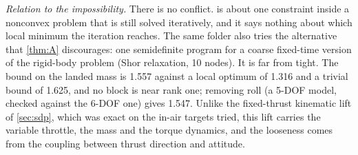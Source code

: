 \emph{Relation to the impossibility.} There is no conflict.  is about one constraint inside a nonconvex problem
that is still solved iteratively, and it says nothing about which local minimum the iteration reaches. The same folder also
tries the alternative that \cref{thm:A} discourages: one semidefinite program for a coarse fixed-time version of the rigid-body
problem (Shor relaxation, 10 nodes). It is far from tight. The bound on the landed mass is 1.557 against a local optimum of 1.316
and a trivial bound of 1.625, and no block is near rank one; removing roll (a 5-DOF model, checked against the 6-DOF one) gives
1.547. Unlike the fixed-thrust kinematic lift of \cref{sec:sdp}, which was exact on the in-air targets tried, this lift carries
the variable throttle, the mass and the torque dynamics, and the looseness comes from the coupling between thrust direction and
attitude.\Snum

